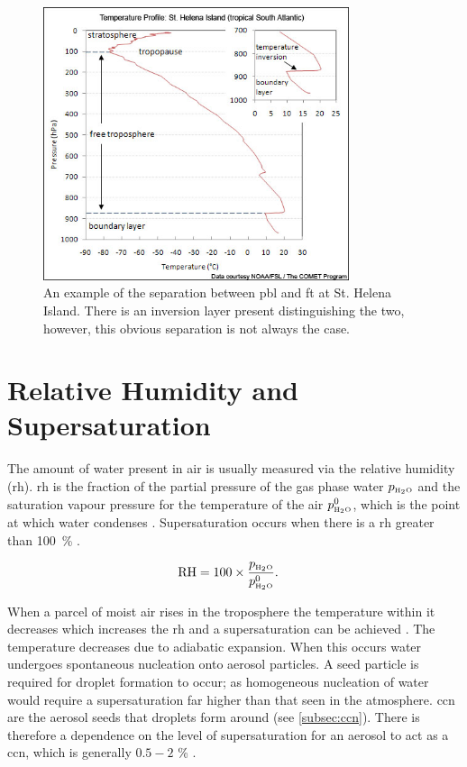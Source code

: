 \begin{figure}[!htb]
	\centering
	\includegraphics[width=0.8\textwidth,natwidth=493,natheight=440]{Fig/Literature_Review/helena_island_skewt.jpg}
	\caption{An example of the separation between \gls{pbl} and \gls{ft} at St. Helena Island. There is an inversion layer present distinguishing the two, however, this obvious separation is not always the case. \citep[Section 1.5.1]{laing2011introduction}}
 	\label{fig:atmolay}
\end{figure}

\section{Relative Humidity and Supersaturation}
\label{subsec:relhum}

The amount of water present in air is usually measured via the relative humidity (\gls{rh}). \gls{rh} is the fraction of the partial pressure of the gas phase water $p_{\text{\tiny H}_2\text{\tiny O}}$ and the saturation vapour pressure for the temperature of the air $p_{\text{\tiny H}_2\text{\tiny O}}^0$, which is the point at which water condenses \citep[Chapter 1]{seinfeld2012atmospheric}. Supersaturation occurs when there is a \gls{rh} greater than \SI{100}{\percent} \citep{rogers1989short}.

\begin{align}
\label{eq:relhum}
	\mathrm{RH} &= 100 \times \frac{p_{\text{\tiny H}_2\text{\tiny O}}}{p_{\text{\tiny H}_2\text{\tiny O}}^0}.
\end{align}

When a parcel of moist air rises in the troposphere the temperature within it decreases which increases the \gls{rh} and a supersaturation can be achieved \citep[Chapter 1]{seinfeld2012atmospheric}. The temperature decreases due to adiabatic expansion. When this occurs water undergoes spontaneous nucleation onto aerosol particles. A seed particle is required for droplet formation to occur; as homogeneous nucleation of water would require a supersaturation far higher than that seen in the atmosphere. \gls{ccn} are the aerosol seeds that droplets form around (see \cref{subsec:ccn}). There is therefore a dependence on the level of supersaturation for an aerosol to act as a \gls{ccn}, which is generally $0.5 - 2$ \si{\percent} \citep[Chapter 6]{rogers1989short}.

